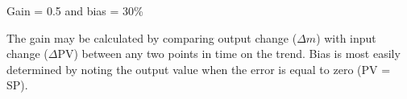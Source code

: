 





Gain = 0.5 and bias = 30\%







The gain may be calculated by comparing output change ($\Delta m$) with input change ($\Delta$PV) between any two points in time on the trend.  Bias is most easily determined by noting the output value when the error is equal to zero (PV = SP).




